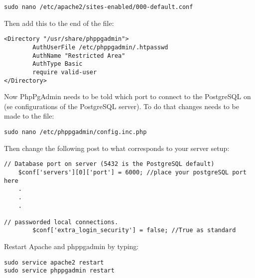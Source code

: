 \begin{verbatim}
sudo nano /etc/apache2/sites-enabled/000-default.conf
\end{verbatim}
Then add this to the end of the file:

\begin{verbatim}
<Directory "/usr/share/phppgadmin">
        AuthUserFile /etc/phppgadmin/.htpasswd
        AuthName "Restricted Area"
        AuthType Basic
        require valid-user
</Directory>

\end{verbatim}

Now PhpPgAdmin needs to be told which port to connect to the PostgreSQL on (se configurations of the PostgreSQL server). %
To do that changes needs to be made to the file:
\begin{verbatim}
sudo nano /etc/phppgadmin/config.inc.php
\end{verbatim}
Then change the following post to what corresponds to your server setup:
\begin{verbatim}
// Database port on server (5432 is the PostgreSQL default)
    $conf['servers'][0]['port'] = 6000; //place your postgreSQL port here 
    .
    .
    .

// passworded local connections.
    	$conf['extra_login_security'] = false; //True as standard

\end{verbatim}




Restart Apache and phppgadmin by typing:
\begin{verbatim}
sudo service apache2 restart
sudo service phppgadmin restart
\end{verbatim}
